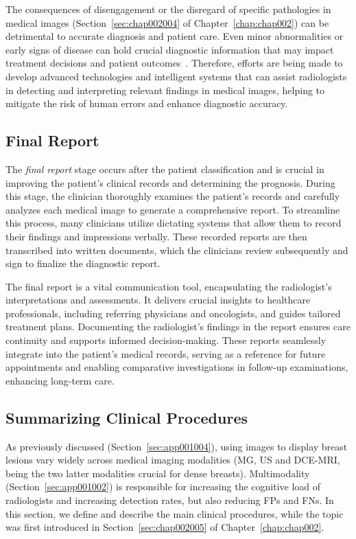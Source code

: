 The consequences of disengagement or the disregard of specific pathologies in medical images (Section~\ref{sec:chap002004} of Chapter~\ref{chap:chap002}) can be detrimental to accurate diagnosis and patient care.
Even minor abnormalities or early signs of disease can hold crucial diagnostic information that may impact treatment decisions and patient outcomes~\cite{doi:10.1148/radiol.2020192534}.
Therefore, efforts are being made to develop advanced technologies and intelligent systems that can assist radiologists in detecting and interpreting relevant findings in medical images, helping to mitigate the risk of human errors and enhance diagnostic accuracy.

\subsection{Final Report}
\label{sec:app001005003}

The {\it final report} stage occurs after the patient classification and is crucial in improving the patient's clinical records and determining the prognosis.
During this stage, the clinician thoroughly examines the patient's records and carefully analyzes each medical image to generate a comprehensive report.
To streamline this process, many clinicians utilize dictating systems that allow them to record their findings and impressions verbally.
These recorded reports are then transcribed into written documents, which the clinicians review subsequently and sign to finalize the diagnostic report.

\textcolor{revised}{The final report is a vital communication tool, encapsulating the radiologist's interpretations and assessments.
It delivers crucial insights to healthcare professionals, including referring physicians and oncologists, and guides tailored treatment plans.
Documenting the radiologist's findings in the report ensures care continuity and supports informed decision-making.
These reports seamlessly integrate into the patient's medical records, serving as a reference for future appointments and enabling comparative investigations in follow-up examinations, enhancing long-term care.}

\subsection{Summarizing Clinical Procedures}
\label{sec:app001005004}

As previously discussed (Section~\ref{sec:app001004}), using images to display breast lesions vary widely across medical imaging modalities (\ac{MG}, \ac{US} and \ac{DCE}-\ac{MRI}, being the two latter modalities crucial for dense breasts).
Multimodality (Section~\ref{sec:app001002}) is responsible for increasing the cognitive load of radiologists and increasing detection rates, but also reducing \acp{FP} and \acp{FN}.
In this section, we define and describe the main clinical procedures, while the topic was first introduced in Section~\ref{sec:chap002005} of Chapter~\ref{chap:chap002}.

